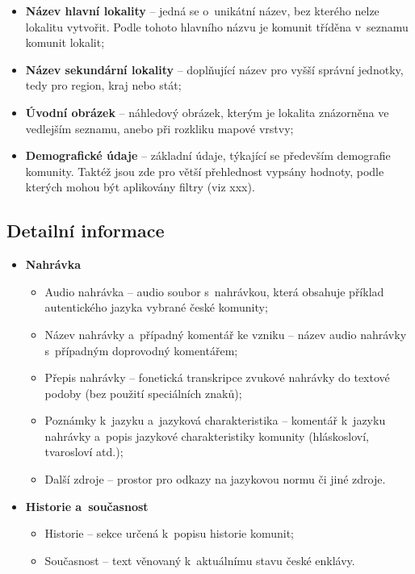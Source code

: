 \begin{itemize}
\tightlist
\item
  \textbf{Název hlavní lokality} -- jedná se o~unikátní název, bez kterého nelze lokalitu vytvořit. Podle tohoto hlavního názvu je komunit tříděna v~seznamu komunit lokalit;
\item
  \textbf{Název sekundární lokality } -- doplňující název pro vyšší správní jednotky, tedy pro region, kraj nebo stát;
\item
  \textbf{Úvodní obrázek} -- náhledový obrázek, kterým je lokalita znázorněna ve vedlejším seznamu, anebo při rozkliku mapové vrstvy;
\item
  \textbf{Demografické údaje} -- základní údaje, týkající se především demografie komunity. Taktéž jsou zde pro větší přehlednost vypsány hodnoty, podle kterých mohou být aplikovány filtry (viz xxx).
\end{itemize}

\hypertarget{detailnuxed-informace}{%
\subsection{Detailní informace}\label{detailnuxed-informace}}

\begin{itemize}
\tightlist
\item
  \textbf{Nahrávka}

  \begin{itemize}
  \tightlist
  \item
    Audio nahrávka -- audio soubor s~nahrávkou, která obsahuje příklad autentického jazyka vybrané české komunity;
  \item
    Název nahrávky a~případný komentář ke vzniku -- název audio nahrávky s~případným doprovodný komentářem;
  \item
    Přepis nahrávky -- fonetická transkripce zvukové nahrávky do textové podoby (bez použití speciálních znaků);
  \item
    Poznámky k~jazyku a~jazyková charakteristika -- komentář k~jazyku nahrávky a~popis jazykové charakteristiky komunity (hláskosloví, tvarosloví atd.);
  \item
    Další zdroje -- prostor pro odkazy na jazykovou normu či jiné zdroje.
  \end{itemize}
\item
  \textbf{Historie a~současnost}

  \begin{itemize}
  \tightlist
  \item
    Historie -- sekce určená k~popisu historie komunit;
  \item
    Současnost -- text věnovaný k~aktuálnímu stavu české enklávy.
  \end{itemize}
\end{itemize}


